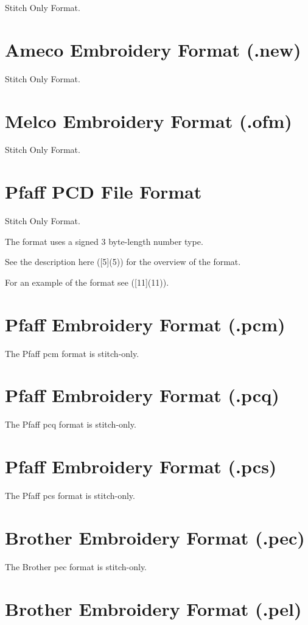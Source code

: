 \documentclass{report}
\begin{document}
Stitch Only Format.

\section{Ameco Embroidery Format (.new)}

Stitch Only Format.

\section{Melco Embroidery Format (.ofm)}

Stitch Only Format.

\section{Pfaff PCD File Format}

Stitch Only Format.

The format uses a signed 3 byte-length number type.

See the description here ([5](5)) for the overview of the format.

For an example of the format see ([11](11)).

\section{Pfaff Embroidery Format (.pcm)}

The Pfaff pcm format is stitch-only.

\section{Pfaff Embroidery Format (.pcq)}

The Pfaff pcq format is stitch-only.

\section{Pfaff Embroidery Format (.pcs)}

The Pfaff pcs format is stitch-only.

\section{Brother Embroidery Format (.pec)}

The Brother pec format is stitch-only.

\section{Brother Embroidery Format (.pel)}
\end{document}
